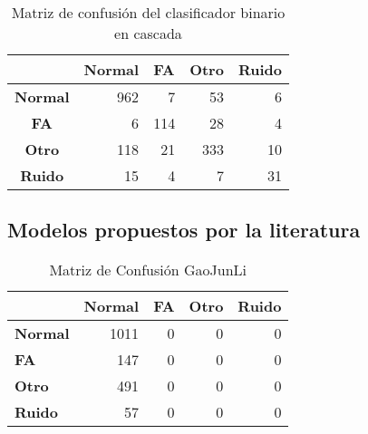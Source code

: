         \begin{table}[H]
        \caption{Matriz de confusión del clasificador binario en cascada}
        \begin{center}
        \begin{tabular}{|c|r|r|r|r|}
        \hline
        \multicolumn{1}{|l|}{} & \multicolumn{1}{l|}{\textbf{Normal}} & \multicolumn{1}{l|}{\textbf{FA}} & \multicolumn{1}{l|}{\textbf{Otro}} & \multicolumn{1}{l|}{\textbf{Ruido}} \\ \hline
        \textbf{Normal} & 962 & 7 & 53 & 6 \\ \hline
        \textbf{FA} & 6 & 114 & 28 & 4 \\ \hline
        \textbf{Otro} & 118 & 21 & 333 & 10 \\ \hline
        \textbf{Ruido} & 15 & 4 & 7 & 31 \\ \hline
        \end{tabular}
        \end{center}
        \label{table:CBC_CM}
        \end{table}


    
    
    
    \subsection{Modelos propuestos por la literatura}
    
    
          
        \begin{table}[H]
        \caption{Matriz de Confusión GaoJunLi}
        \begin{center}
        \begin{tabular}{|l|r|r|r|r|}
        \hline
         & \multicolumn{1}{l|}{\textbf{Normal}} & \multicolumn{1}{l|}{\textbf{FA}} & \multicolumn{1}{l|}{\textbf{Otro}} & \multicolumn{1}{l|}{\textbf{Ruido}} \\ \hline
        \textbf{Normal} & 1011 & 0 & 0 & 0 \\ \hline
        \textbf{FA} & 147 & 0 & 0 & 0 \\ \hline
        \textbf{Otro} & 491 & 0 & 0 & 0 \\ \hline
        \textbf{Ruido} & 57 & 0 & 0 & 0 \\ \hline
        \end{tabular}
        \end{center}
        \label{table:GaoJunLin_CM}
        \end{table}
        
